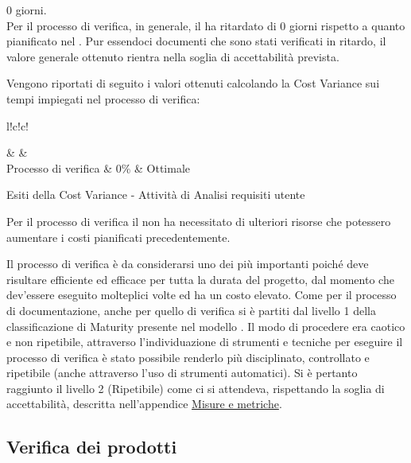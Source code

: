\documentclass[a4paper, titlepage]{article}
\begin{document}
\begin{description}
\item{} 0 giorni.
\\Per il processo di verifica, in generale, il  ha ritardato di 0 giorni rispetto a quanto pianificato nel . Pur essendoci documenti che sono stati verificati in ritardo, il valore generale ottenuto rientra nella soglia di accettabilità prevista.
\end{description}

Vengono riportati di seguito i valori ottenuti calcolando la Cost Variance sui tempi impiegati nel processo di verifica:
\begin{tabella}{l!{\VRule}c!{\VRule}c!{\VRule}}
	
	\color{white}  & \color{white}  &\color{white}  \\
	\endfirsthead
	Processo di verifica & 0\% & Ottimale\\
	\caption{Esiti della Cost Variance - Attività di Analisi requisiti utente}	  
\end{tabella}

 Per il processo di verifica il  non ha necessitato di ulteriori risorse che potessero aumentare i costi pianificati precedentemente.

Il processo di verifica è da considerarsi uno dei più importanti poiché deve risultare efficiente ed efficace per tutta la durata del progetto, dal momento che dev'essere eseguito molteplici volte ed ha un costo elevato.
\newline Come per il processo di documentazione, anche per quello di verifica si è partiti dal livello 1 della classificazione di Maturity presente nel modello . Il modo di procedere era caotico e non ripetibile, attraverso l'individuazione di strumenti e tecniche per eseguire il processo di verifica è stato possibile renderlo più disciplinato, controllato e ripetibile (anche attraverso l'uso di strumenti automatici).
\newline Si è pertanto raggiunto il livello 2 (Ripetibile) come ci si attendeva, rispettando la soglia di accettabilità, descritta nell'appendice \hyperref[sec:metr]{Misure e metriche}.

\subsection{Verifica dei prodotti}
\end{document}
